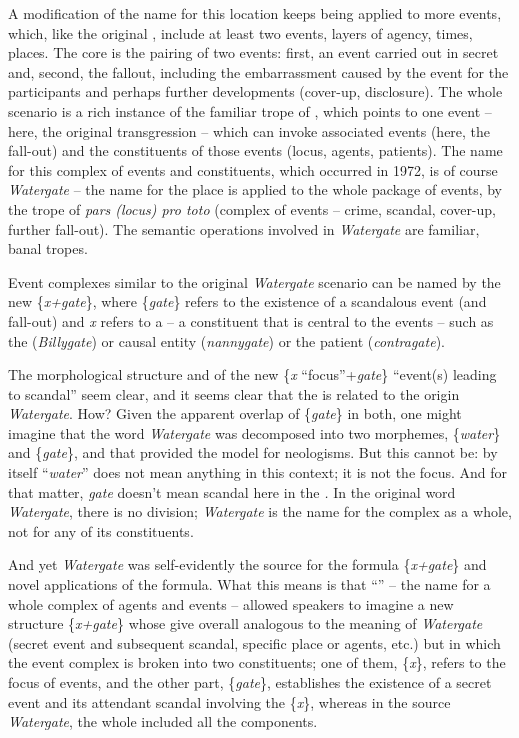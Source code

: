 \documentclass[output=paper,
modfonts
]{LSP/langsci}
\begin{document}
A modification of the name for this location keeps being applied to more
events, which, like the original , include at least two events,
layers of agency, times, places. The core is the pairing of two events:
first, an event carried out in secret and, second, the fallout,
including the embarrassment caused by the event for the participants and
perhaps further developments (cover-up, disclosure). The whole scenario
is a rich instance of the familiar trope of , which points to
one event -- here, the original transgression -- which can invoke
associated events (here, the fall-out) and the constituents of those
events (locus, agents, patients). The name for this complex of events
and constituents, which occurred in 1972, is of course
\emph{Watergate} -- the name for the place is applied to the whole
package of events, by the trope of \emph{pars (locus) pro toto} (complex of
events -- crime, scandal, cover-up, further fall-out). The semantic
operations involved in \emph{Watergate} are familiar, banal tropes.

Event complexes similar to the original \emph{Watergate} scenario can be
named by the new  \{\emph{x+gate}\}, where \{\emph{gate}\}
refers to the existence of a scandalous event (and fall-out) and
\emph{x} refers to a  -- a constituent that is central to the
events -- such as the  (\emph{Billygate}) or causal entity
(\emph{nannygate}) or the patient (\emph{contragate}).

The morphological structure and  of the new  \{\emph{x}
``focus''+\emph{gate}\} ``event(s) leading to scandal'' seem clear, and it
seems clear that the  is related to the origin \emph{Watergate}.
How? Given the apparent overlap of \{\emph{gate}\} in both, one might
imagine that the word \emph{Watergate} was decomposed into two
morphemes, \{\emph{water}\} and \{\emph{gate}\}, and that 
provided the model for neologisms. But this cannot be: by itself
``\emph{water}'' does not mean anything in this context; it is not the
focus. And for that matter, \emph{gate} doesn't mean scandal here in
the  \emph{.} In the original word \emph{Watergate},
there is no division; \emph{Watergate} is the name for the complex as a
whole, not for any of its constituents.

And yet \emph{Watergate} was self-evidently the source for the formula
\{\emph{x+gate}\} and novel applications of the formula. What this means
is that ``'' -- the name for a whole complex of agents and
events -- allowed speakers to imagine a new structure \{\emph{x+gate}\}
whose  give overall  analogous to the meaning of
\emph{Watergate} (secret event and subsequent scandal, specific place or
agents, etc.) but in which the event complex is broken into two
constituents; one of them, \{\emph{x}\}, refers to the focus of events,
and the other part, \{\emph{gate}\}, establishes the existence of a
secret event and its attendant scandal involving the  \{\emph{x}\},
whereas in the source \emph{Watergate}, the whole included all the
components.
\end{document}
